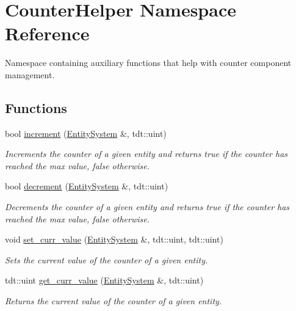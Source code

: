 \hypertarget{namespace_counter_helper}{}\section{Counter\+Helper Namespace Reference}
\label{namespace_counter_helper}


Namespace containing auxiliary functions that help with counter component management.  


\subsection*{Functions}
\begin{DoxyCompactItemize}
\item 
bool \hyperlink{namespace_counter_helper_accd2a12c93a7bb81dbf8eccebb183818}{increment} (\hyperlink{class_entity_system}{Entity\+System} \&, tdt\+::uint)
\begin{DoxyCompactList}\small\item\em Increments the counter of a given entity and returns true if the counter has reached the max value, false otherwise. \end{DoxyCompactList}\item 
bool \hyperlink{namespace_counter_helper_af3707a7ff26096d8318e5371fb476bc2}{decrement} (\hyperlink{class_entity_system}{Entity\+System} \&, tdt\+::uint)
\begin{DoxyCompactList}\small\item\em Decrements the counter of a given entity and returns true if the counter has reached the max value, false otherwise. \end{DoxyCompactList}\item 
void \hyperlink{namespace_counter_helper_aedbe1dc2d80065781488c221148f997f}{set\+\_\+curr\+\_\+value} (\hyperlink{class_entity_system}{Entity\+System} \&, tdt\+::uint, tdt\+::uint)
\begin{DoxyCompactList}\small\item\em Sets the current value of the counter of a given entity. \end{DoxyCompactList}\item 
tdt\+::uint \hyperlink{namespace_counter_helper_a67cfbcf73ceaa2826d714f2621d668df}{get\+\_\+curr\+\_\+value} (\hyperlink{class_entity_system}{Entity\+System} \&, tdt\+::uint)
\begin{DoxyCompactList}\small\item\em Returns the current value of the counter of a given entity. \end{DoxyCompactList}\item 

\end{DoxyCompactItemize}
